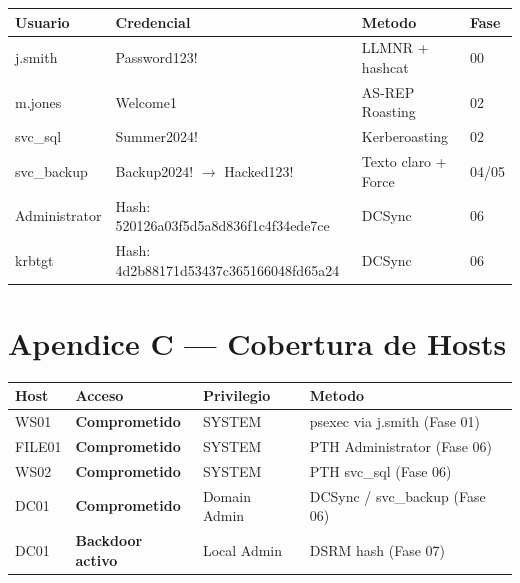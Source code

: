 \documentclass[11pt,a4paper]{article}
\begin{document}
\begin{center}
\begin{tabularx}{\textwidth}{lXll}
\toprule
\textbf{Usuario} & \textbf{Credencial} & \textbf{Metodo} & \textbf{Fase} \\
\midrule
j.smith       & Password123!                              & LLMNR + hashcat      & 00 \\
m.jones       & Welcome1                                  & AS-REP Roasting      & 02 \\
svc\_sql      & Summer2024!                               & Kerberoasting        & 02 \\
svc\_backup   & Backup2024! $\to$ Hacked123!              & Texto claro + Force  & 04/05 \\
Administrator & Hash: 520126a03f5d5a8d836f1c4f34ede7ce    & DCSync               & 06 \\
krbtgt        & Hash: 4d2b88171d53437c365166048fd65a24    & DCSync               & 06 \\
\bottomrule
\end{tabularx}
\end{center}

\vspace{0.6cm}

\section{Apendice C --- Cobertura de Hosts}

\begin{center}
\begin{tabularx}{\textwidth}{lllX}
\toprule
\textbf{Host} & \textbf{Acceso} & \textbf{Privilegio} & \textbf{Metodo} \\
\midrule
WS01   & \textcolor{low}{\textbf{Comprometido}}    & SYSTEM       & psexec via j.smith (Fase 01) \\
FILE01 & \textcolor{low}{\textbf{Comprometido}}    & SYSTEM       & PTH Administrator (Fase 06) \\
WS02   & \textcolor{low}{\textbf{Comprometido}}    & SYSTEM       & PTH svc\_sql (Fase 06) \\
DC01   & \textcolor{low}{\textbf{Comprometido}}    & Domain Admin & DCSync / svc\_backup (Fase 06) \\
DC01   & \textcolor{low}{\textbf{Backdoor activo}} & Local Admin  & DSRM hash (Fase 07) \\
\bottomrule
\end{tabularx}
\end{center}
\end{document}

